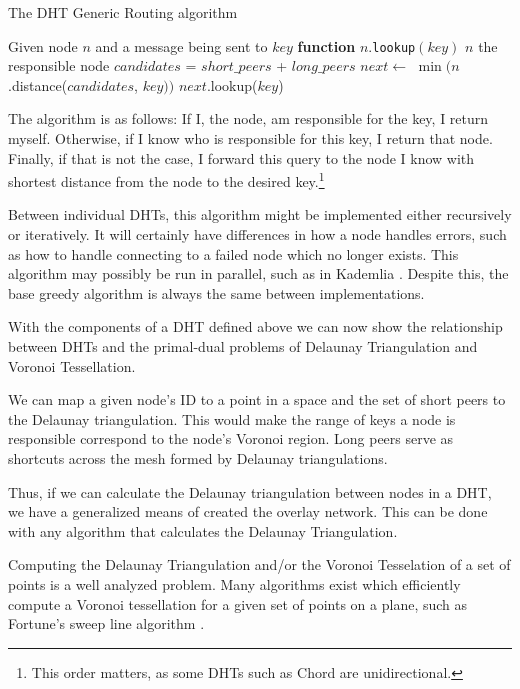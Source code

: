 \documentclass[11pt,conference]{IEEEtran}
\begin{document}
\begin{algorithm}
	\caption{The DHT Generic Routing algorithm}
	\label{alg:routing}
	\begin{algorithmic}[1]
		\STATE Given node $n$ and a message being sent to $key$
		\STATE \textbf{function} $n.$\texttt{lookup}$(key)$
		\RETURN $ n $
		\ENDIF
		\RETURN the responsible node
		\ENDIF
		\STATE $ candidates $ = $ short\_peers $ + $ long\_peers $
		\STATE $ next  \leftarrow $  $\min (n$.distance($candidates$, $ key ))$
		\RETURN $next.$lookup($key$)
	\end{algorithmic}
	
	\scriptsize
\end{algorithm}
The algorithm is as follows:
If I, the node, am responsible for the key, I return myself.
Otherwise, if I know who is responsible for this key, I return that node.
Finally, if that is not the case, I forward this query to the node I know with shortest distance from the node to the desired key.\footnote{This order matters, as some DHTs such as Chord are unidirectional.} 

Between individual DHTs, this algorithm might be implemented either recursively or iteratively.
It will certainly have differences in how a node handles errors, such as how to handle connecting to a failed node which no longer exists.
This algorithm may possibly be  run in parallel, such as in Kademlia \cite{kademlia}.
Despite this, the base greedy algorithm is always the same between implementations.



With the components of a DHT defined above we can now show the relationship between DHTs and the primal-dual problems of Delaunay Triangulation and Voronoi Tessellation.

We can map a given node's ID to a point in a space and the set of short peers to the Delaunay triangulation.
This would make the range of keys a node is responsible correspond to the node's Voronoi region.
Long peers serve as shortcuts across the mesh formed by Delaunay triangulations.


Thus, if we can calculate the Delaunay triangulation between nodes in a DHT, we have a generalized means of created the overlay network.
This can be done with any algorithm that calculates the Delaunay Triangulation.

Computing the Delaunay Triangulation and/or the Voronoi Tesselation of a set of points is a well analyzed problem.
Many algorithms exist which efficiently compute a Voronoi tessellation for a given set of points on a plane, such as Fortune's sweep line algorithm \cite{fortune1987sweepline}.
\end{document}
